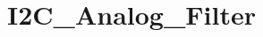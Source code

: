 \hypertarget{group___i2_c___analog___filter}{\section{I2\-C\-\_\-\-Analog\-\_\-\-Filter}
\label{group___i2_c___analog___filter}
}
